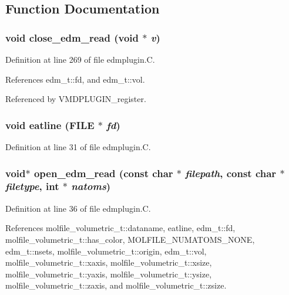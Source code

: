 \subsection{Function Documentation}
\subsubsection{\setlength{\rightskip}{0pt plus 5cm}void close\_\-edm\_\-read (void $\ast$ {\em v})\hspace{0.3cm}{\tt  [static]}}\label{edmplugin_8C_a5}




Definition at line 269 of file edmplugin.C.

References edm\_\-t::fd, and edm\_\-t::vol.

Referenced by VMDPLUGIN\_\-register.
\subsubsection{\setlength{\rightskip}{0pt plus 5cm}void eatline (FILE $\ast$ {\em fd})\hspace{0.3cm}{\tt  [static]}}\label{edmplugin_8C_a1}




Definition at line 31 of file edmplugin.C.
\subsubsection{\setlength{\rightskip}{0pt plus 5cm}void$\ast$ open\_\-edm\_\-read (const char $\ast$ {\em filepath}, const char $\ast$ {\em filetype}, int $\ast$ {\em natoms})\hspace{0.3cm}{\tt  [static]}}\label{edmplugin_8C_a2}




Definition at line 36 of file edmplugin.C.

References molfile\_\-volumetric\_\-t::dataname, eatline, edm\_\-t::fd, molfile\_\-volumetric\_\-t::has\_\-color, MOLFILE\_\-NUMATOMS\_\-NONE, edm\_\-t::nsets, molfile\_\-volumetric\_\-t::origin, edm\_\-t::vol, molfile\_\-volumetric\_\-t::xaxis, molfile\_\-volumetric\_\-t::xsize, molfile\_\-volumetric\_\-t::yaxis, molfile\_\-volumetric\_\-t::ysize, molfile\_\-volumetric\_\-t::zaxis, and molfile\_\-volumetric\_\-t::zsize.

